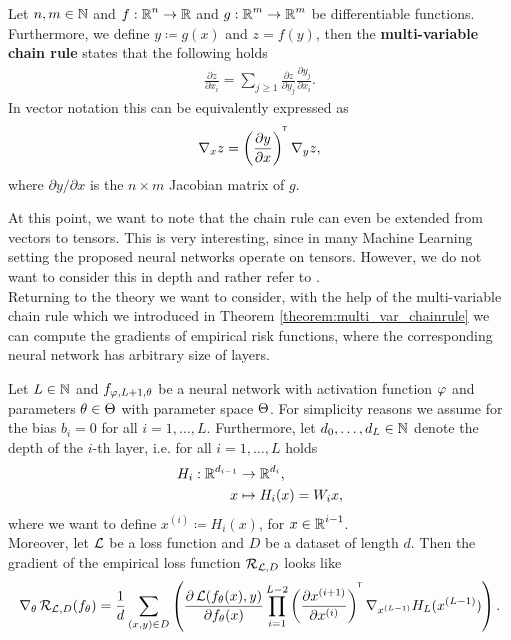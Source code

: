 \begin{theorem}\label{theorem:multi_var_chainrule}
Let $n,m\in\operatorname{\mathbb{N}}$ and $f:\operatorname{\mathbb{R}}^{n} \to \operatorname{\mathbb{R}}$ and $g:\operatorname{\mathbb{R}}^{m} \to \operatorname{\mathbb{R}}^{m}$ be differentiable functions. Furthermore, we define $y \coloneqq g(x)$ and $z=f(y)$, then the \textbf{multi-variable chain rule} states that the following holds
\begin{align*}
\frac{\partial z}{\partial x_i} = \sum_{j\geq 1} \frac{\partial z}{\partial y_j} \frac{\partial y_j}{\partial x_i}.
\end{align*}
In vector notation this can be equivalently expressed as
\begin{align*}
\nabla_x z = \left( \frac{\partial y}{\partial x} \right)^{^{\mkern-1.5mu\mathsf{T}}} \nabla_{y} z,
\end{align*}
where $\partial y/\partial x$ is the $n\times m$ Jacobian matrix of $g$.
\end{theorem}

At this point, we want to note that the chain rule can even be extended from vectors to tensors. This is very interesting, since in many Machine Learning setting the proposed neural networks operate on tensors. However, we do not want to consider this in depth and rather refer to \cite[Chapter~6.5.2]{goodfellow2016deep}.\\
Returning to the theory we want to consider, with the help of the multi-variable chain rule which we introduced in Theorem \ref{theorem:multi_var_chainrule} we can compute the gradients of empirical risk functions, where the corresponding neural network has arbitrary size of layers.

\begin{theorem}\label{theorem:grad_nn}
Let $L\in\operatorname{\mathbb{N}}$ and $f_{\operatorname{\varphi},L+1, \theta}$ be a neural network with activation function $\operatorname{\varphi}$ and parameters $\theta\in\operatorname{\Theta}$ with parameter space $\operatorname{\Theta}$. For simplicity reasons we assume for the bias $b_i=0$ for all $i=1,\ldots, L$. Furthermore, let $d_0,\ldots,d_L\in\operatorname{\mathbb{N}}$ denote the depth of the $i$-th layer, i.e. for all $i=1,\ldots,L$ holds
\begin{align*}
H_i: \operatorname{\mathbb{R}}^{d_{i-1}} &\to \operatorname{\mathbb{R}}^{d_{i}},\\
x &\mapsto H_i(x) = W_ix,
\end{align*}
where we want to define $x^{(i)}\coloneqq H_i(x)$, for $x\in\operatorname{\mathbb{R}}^{i-1}$.\\
Moreover, let $\operatorname{\mathcal{L}}$ be a loss function and $D$ be a dataset of length $d$. Then the gradient of the empirical loss function $\operatorname{\mathcal{R}}_{\operatorname{\mathcal{L}}, D}$ looks like
\begin{align*}
\nabla_{\theta} \operatorname{\mathcal{R}}_{\operatorname{\mathcal{L}}, D} (f_{\theta}) = \frac{1}{d}\sum_{(x,y) \in D}\left( \frac{\partial \operatorname{\mathcal{L}}(f_{\theta}(x), y)}{\partial f_{\theta}(x)} \prod_{i=1}^{L-2}\left(\frac{\partial x^{(i+1)}}{\partial x^{(i)}} \right)^{^{\mkern-1.5mu\mathsf{T}}} \nabla_{x^{(L-1)}}H_L(x^{(L-1)})\right).
\end{align*}
\end{theorem}


